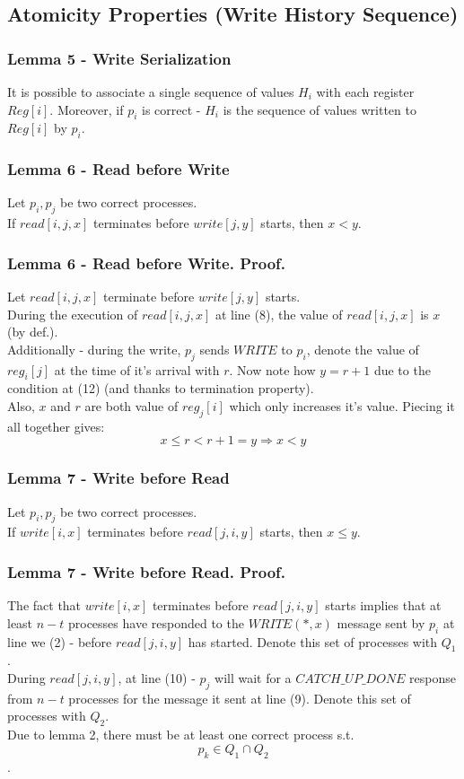 \subsection{Atomicity Properties (Write History Sequence)}
\begin{frame}
    \frametitle{Lemma 5 - Write Serialization}
    \begin{lemma}
        It is possible to associate a single sequence of values $H_i$
        with each register $Reg[i]$. Moreover, if $p_i$ is correct -
        $H_i$ is the sequence of values written to $Reg[i]$ by $p_i$.
    \end{lemma}
\end{frame}
\begin{frame}
    \frametitle{Lemma 6 - Read before Write}
    \begin{lemma}
        Let $p_i, p_j$ be two correct processes.\\
        If $read[i,j,x]$ terminates before $write[j,y]$ starts, then $x<y$.
    \end{lemma}
\end{frame}
\begin{frame}
    \frametitle{Lemma 6 - Read before Write. Proof.}
        Let $read[i,j,x]$ terminate before $write[j,y]$ starts.\\
        During the execution of $read[i,j,x]$ at line (8), the value of $read[i,j,x]$
        is $x$ (by def.).\\
        Additionally - during the write, $p_j$ sends $WRITE$ to
        $p_i$, denote the value of $reg_i[j]$ at the time of it's arrival
        with $r$. Now note how $y=r+1$ due to the condition at (12) (and thanks to termination property).\\
        Also, $x$ and $r$ are both value of $reg_j[i]$ which only increases it's value.
        Piecing it all together gives:
        \[
            x\leq r<r+1=y \Rightarrow x<y
        \]
\end{frame}
\begin{frame}
    \frametitle{Lemma 7 - Write before Read}
    \begin{lemma}
        Let $p_i, p_j$ be two correct processes.\\
        If $write[i,x]$ terminates before $read[j,i,y]$ starts, then $x\leq y$.
    \end{lemma}
\end{frame}
\begin{frame}
    \frametitle{Lemma 7 - Write before Read. Proof.}
    The fact that $write[i,x]$ terminates before $read[j,i,y]$ starts
    implies that at least $n-t$ processes have responded to the
    $WRITE(*,x)$ message sent by $p_i$ at line we (2) - before $read[j,i,y]$ has started. Denote
    this set of processes with \alert{$Q_1$}.\\
    During $read[j,i,y]$, at line (10) - $p_j$ will wait for a $CATCH\_UP\_DONE$ response from
    $n-t$ processes for the message it sent at line (9).
    Denote this set of processes with \alert{$Q_2$}.\\
    Due to lemma 2, there must be at least one correct process s.t. \alert{
        \[p_k\in Q_1\cap Q_2\]
    }.
\end{frame}
